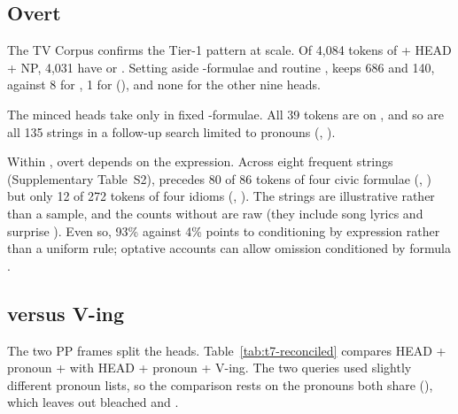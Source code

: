 \documentclass[12pt]{article}
\begin{document}
\subsection{Overt }
\label{sec:god-split}

The TV Corpus confirms the Tier-1 pattern at scale. Of 4,084 tokens of  + HEAD + NP, 4,031 have  or . Setting aside -formulae and routine ,  keeps 686 and  140, against 8 for , 1 for  (), and none for the other nine heads.

The minced heads take  only in fixed -formulae. All 39  tokens are on , and so are all 135  strings in a follow-up search limited to pronouns (, ).

Within , overt  depends on the expression. Across eight frequent strings (Supplementary Table~S2),  precedes 80 of 86 tokens of four civic formulae (, ) but only 12 of 272 tokens of four idioms (, ). The strings are illustrative rather than a sample, and the counts without  are raw (they include song lyrics and surprise ). Even so, 93\% against 4\% points to conditioning by expression rather than a uniform rule; optative accounts can allow omission conditioned by formula \citep{grosz2012}.

\subsection{ versus  V-ing}
\label{sec:dissoc}

The two PP frames split the heads. Table~\ref{tab:t7-reconciled} compares HEAD + pronoun +  with HEAD + pronoun +  V-ing. The two queries used slightly different pronoun lists, so the comparison rests on the pronouns both share (), which leaves out bleached  and .
\end{document}
